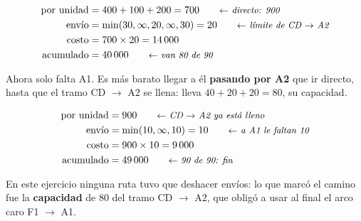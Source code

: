 \documentclass[11pt,a4paper]{article}
\newcommand{\ra}{\ensuremath{\to}}
\begin{document}
\noindent
\begin{minipage}[c]{0.32\textwidth}\centering
{}
\end{minipage}\hfill
\begin{minipage}[c]{0.66\textwidth}
\begin{align*}
\text{por unidad} &= 400 + 100 + 200 = 700 \nota{directo: 900}\\
\text{envío} &= \min(30, \infty, 20, \infty, 30) = 20 \nota{límite de CD \ra{} A2}\\
\text{costo} &= 700 \times 20 = 14\,000\\
\text{acumulado} &= 40\,000 \nota{van 80 de 90}
\end{align*}
\end{minipage}

Ahora solo falta A1. Es más barato llegar a él \textbf{pasando por A2} que ir directo, hasta que el tramo CD \ra{} A2
se llena: lleva $40 + 20 + 20 = 80$, su capacidad.

\noindent
\begin{minipage}[c]{0.32\textwidth}\centering
{}
\end{minipage}\hfill
\begin{minipage}[c]{0.66\textwidth}
\begin{align*}
\text{por unidad} &= 900 \nota{CD \ra{} A2 ya está lleno}\\
\text{envío} &= \min(10, \infty, 10) = 10 \nota{a A1 le faltan 10}\\
\text{costo} &= 900 \times 10 = 9\,000\\
\text{acumulado} &= 49\,000 \nota{90 de 90: fin}
\end{align*}
\end{minipage}

En este ejercicio ninguna ruta tuvo que deshacer envíos: lo que marcó el camino fue la \textbf{capacidad} de 80 del
tramo CD \ra{} A2, que obligó a usar al final el arco caro F1 \ra{} A1.
\end{document}
